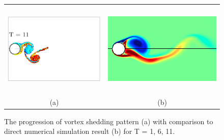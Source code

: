\begin{figure}
\begin{center}
\begin{tabular}{cc}
 \includegraphics[height=4.5cm]{./Figures/results/rotating/vortices_T11.pdf}  &
 \includegraphics[height=4.5cm]{./Figures/results/rotating/T_11.png}  \\
 (a) & (b) \\
 \end{tabular}
\end{center}
 \caption[Vortex shedding pattern around a sinusoidally rotating cylinder]{The progression of vortex shedding pattern (a) with comparison to direct numerical simulation result (b) for T = 1, 6, 11. }
 \label{fig:RotatingWake1}
\end{figure}

